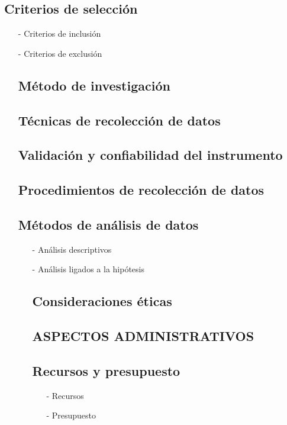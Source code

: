 \documentclass{report}
\begin{document}
\begin{enumerate}
\begin{enumerate}
\begin{enumerate}
\begin{enumerate}
\begin{enumerate}
\begin{enumerate}
\subsection{Criterios de selección}
\begin{enumerate}
\item[-] Criterios de inclusión
\item[-] Criterios de exclusión
\begin{enumerate}
\subsection{Método de investigación}
\subsection{Técnicas de recolección de datos}
\subsection{Validación y confiabilidad del instrumento}
\subsection{Procedimientos de recolección de datos}
\subsection{Métodos de análisis de datos}
\begin{enumerate}
\item[-] Análisis descriptivos
\item[-] Análisis ligados a la hipótesis
\begin{enumerate}
\subsection{Consideraciones éticas}

\section{ASPECTOS ADMINISTRATIVOS}
\subsection{Recursos y presupuesto}
\begin{enumerate}
\item[-] Recursos
\item[-] Presupuesto
\begin{enumerate}

\end{enumerate}
\end{enumerate}
\end{enumerate}
\end{enumerate}
\end{enumerate}
\end{enumerate}
\end{enumerate}
\end{enumerate}
\end{enumerate}
\end{enumerate}
\end{enumerate}
\end{enumerate}
\end{document}
